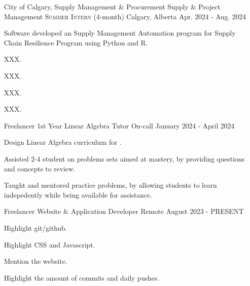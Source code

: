 


\begin{cventries}
  \cventry
    {City of Calgary, Supply Management \& Procurement} %
    {Supply \& Project Management  \textsc{Summer Intern} (4-month)} %
    {Calgary, Alberta } %
    {Apr. 2024 - Aug. 2024} %
    {
      \begin{cvitems} %
        \item Software developed an Supply Management Automation program for Supply Chain Resilience Program using Python and R.
        \item XXX.
        \item XXX.
        \item XXX.
        \item XXX.
      \end{cvitems}
    }

  \cventry
    {Freelancer} %
    {1st Year Linear Algebra Tutor} %
    {On-call} %
    {January 2024  - April 2024} %
    {
      \begin{cvitems} %
        \item Design Linear Algebra curriculum for .
        \item Assisted 2-4 student on problems sets aimed at mastery, by providing questions and concepts to review.
        \item Taught and mentored practice problems, by allowing students to learn indepedently while being available for assistance.
      \end{cvitems}
    }


  \cventry
    {Freelancer} %
    {Website \& Application Developer} %
    {Remote} %
    {August 2023 - PRESENT} %
    {
      \begin{cvitems} %
        \item Highlight git/github.
        \item Highlight CSS and Javascript.
        \item Mention the website.
        \item Highlight the amount of commits and daily pushes.
      \end{cvitems}
    }




\end{cventries}
